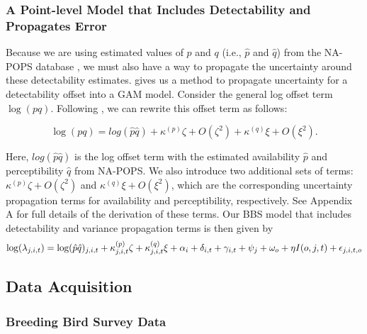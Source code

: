 \documentclass[12pt]{article}
\begin{document}
\subsubsection{A Point-level Model that Includes Detectability and Propagates Error}\label{varprop-text}

\par Because we are using estimated values of $p$ and $q$ (i.e., $\hat{p}$ and $\hat{q}$) from the NA-POPS database \citep{edwards_point_2023}, we must also have a way to propagate the uncertainty around these detectability estimates. \citet{bravington_variance_2021} gives us a method to propagate uncertainty for a detectability offset into a GAM model. Consider the general log offset term $\log(p q)$. Following \citet{bravington_variance_2021}, we can rewrite this offset term as follows:

\begin{equation}\label{offset}
	\log(pq) = log(\hat{p} \hat{q}) + \kappa^{(p)}\zeta + O(\zeta^2) + \kappa^{(q)}\xi + O(\xi^2).
\end{equation}
	 
\par Here, $log(\hat{p} \hat{q})$ is the log offset term with the estimated availability $\hat{p}$ and perceptibility $\hat{q}$ from NA-POPS. 
We also introduce two additional sets of terms: $\kappa^{(p)}\zeta + O(\zeta^2)$ and $\kappa^{(q)}\xi + O(\xi^2)$, which are the corresponding uncertainty propagation terms for availability and perceptibility, respectively.  
See Appendix A for full details of the derivation of these terms.
Our BBS model that includes detectability and variance propagation terms is then given by
\begin{equation}\label{bbs_varprop}
	\log(\lambda_{j,i,t}) = \log(\hat{p} \hat{q})_{j,i,t} + \kappa_{j,i,t}^{(p)}\zeta + \kappa_{j,i,t}^{(q)}\xi + \alpha_i + \delta_{i,t} + \gamma_{i,t} + \psi_j + \omega_o + \eta I(o,j,t) + \epsilon_{j,i,t,o} \\
\end{equation}

\subsection{Data Acquisition}

\subsubsection{Breeding Bird Survey Data}
\end{document}
